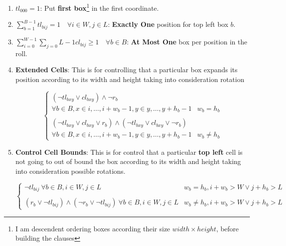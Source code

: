 \documentclass[12pt, a4paper]{article}
\begin{document}
\begin{enumerate}
  \item $tl_{000} = 1$: Put \textbf{first box}\footnote{I am descendent ordering boxes according their size $width \times height$, before building the clauses}  in the first coordinate.\label{prop:1}
  \item $\sum_{b=1}^{B-1} tl_{bij} = 1 \quad \forall i \in W, j \in L$: \textbf{Exactly One} position for top left box $b$. \label{prop:2}
  \item $\sum_{i=0}^{W-1} \sum_{j=0}{L-1} cl_{bij} \geq 1 \quad \forall b \in B$: \textbf{At Most One} box per position in the roll. \label{prop:3}
  \item \textbf{Extended Cells}: This is for controlling that a particular box expands its position according to its width and height taking into consideration rotation \label{prop:4}

   \begin{equation}
    \begin{cases}
      (\lnot tl_{bxy} \lor cl_{bxy}) \land \lnot r_b \ \\
        \forall b \in B, x \in {i, \dots, i + w_b - 1}, y \in {y, \dots, y + h_b - 1}  & w_b = h_b \\\\
      (\lnot tl_{bxy} \lor cl_{bxy} \lor r_b) \land (\lnot tl_{bxy} \lor cl_{bxy} \lor \lnot r_b) \ \\
        \forall b \in B, x \in {i, \dots, i + w_b - 1}, y \in {y, \dots, y + h_b - 1} & w_b \neq h_b
    \end{cases}
  \end{equation}

\item \textbf{Control Cell Bounds}: This is for control that a particular \textbf{top left} cell is not going to out of bound the box according to its width and height taking into consideration possible rotations.\label{prop:5}

   \begin{equation}
    \begin{cases}
      \lnot tl_{bij} \ \forall b \in B, i \in W, j \in L & w_b = h_b, i+w_b > W \lor j+h_b > L \\\\
      (r_b \lor \lnot tl_{bij}) \land (\lnot r_b \lor \lnot tl_{bij}) \ \forall b \in B, i \in W, j \in L & w_b \neq h_b, i+w_b > W \lor j+h_b > L
    \end{cases}
  \end{equation}

\end{enumerate}
\end{document}
